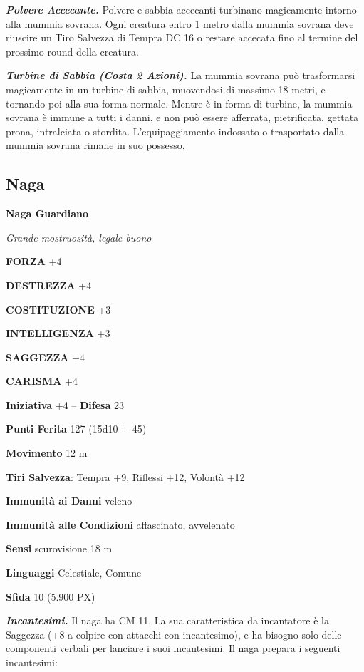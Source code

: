 \begin{multicols}{2}
\textit{\textbf{Polvere Accecante.}} Polvere e sabbia accecanti turbinano magicamente intorno alla mummia sovrana. Ogni creatura entro 1 metro dalla mummia sovrana deve riuscire un Tiro Salvezza di Tempra DC 16 o restare accecata fino al termine del prossimo round della creatura.

\textit{\textbf{Turbine di Sabbia (Costa 2 Azioni).}} La mummia sovrana può trasformarsi magicamente in un turbine di sabbia, muovendosi di massimo 18 metri, e tornando poi alla sua forma normale. Mentre è in forma di turbine, la mummia sovrana è immune a tutti i danni, e non può essere afferrata, pietrificata, gettata prona, intralciata o stordita. L'equipaggiamento indossato o trasportato dalla mummia sovrana rimane in suo possesso.

\subsection{Naga}

\medskip{}\textbf{Naga Guardiano}

\textit{Grande mostruosità, legale buono}

\textbf{FORZA} +4

\textbf{DESTREZZA} +4

\textbf{COSTITUZIONE} +3

\textbf{INTELLIGENZA} +3

\textbf{SAGGEZZA} +4

\textbf{CARISMA} +4

\textbf{Iniziativa} +4 -- \textbf{Difesa} 23

\textbf{Punti Ferita} 127 (15d10 + 45)

\textbf{Movimento} 12 m

\textbf{Tiri Salvezza}: Tempra +9, Riflessi +12, Volontà +12

\textbf{Immunità ai Danni} veleno

\textbf{Immunità alle Condizioni} affascinato, avvelenato

\textbf{Sensi} scurovisione 18 m

\textbf{Linguaggi} Celestiale, Comune

\textbf{Sfida} 10 (5.900 PX)

\textit{\textbf{Incantesimi.}} Il naga ha CM 11. La sua caratteristica da incantatore è la Saggezza (+8 a colpire con attacchi con incantesimo), e ha bisogno solo delle componenti verbali per lanciare i suoi incantesimi. Il naga prepara i seguenti incantesimi:


\end{multicols}
